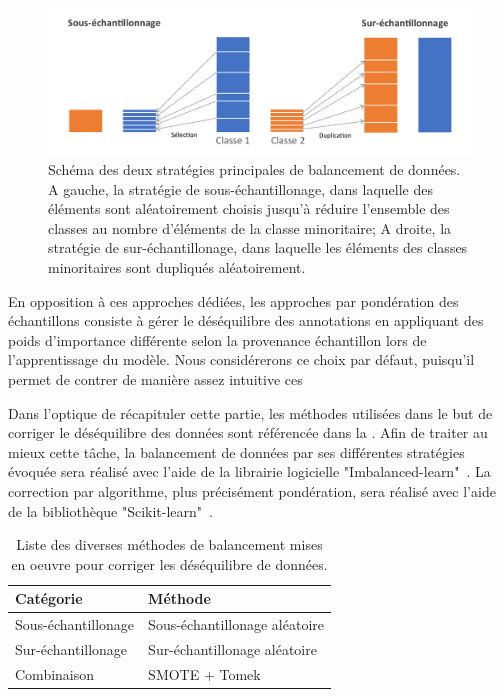\begin{figure}[H]
    \centering
    \includegraphics[width=\linewidth]{contents/chapter_4/resources/scheme_data_balancing.pdf}
    \caption{Schéma des deux stratégies principales de balancement de données. A gauche, la stratégie de sous-échantillonage, dans laquelle des éléments sont aléatoirement choisis jusqu'à réduire l'ensemble des classes au nombre d'éléments de la classe minoritaire; A droite, la stratégie de sur-échantillonage, dans laquelle les éléments des classes minoritaires sont dupliqués aléatoirement. }
    \label{fig:scheme_data_balancing}
\end{figure}\par

En opposition à ces approches dédiées, les approches par pondération des échantillons consiste à gérer le déséquilibre des annotations en appliquant des poids d'importance différente selon la provenance échantillon lors de l'apprentissage du modèle. Nous considérerons ce choix par défaut, puisqu'il permet de contrer de manière assez intuitive ces

Dans l'optique de récapituler cette partie, les méthodes utilisées dans le but de corriger le déséquilibre des données sont référencée dans la . Afin de traiter au mieux cette tâche, la balancement de données par ses différentes stratégies évoquée sera réalisé avec l'aide de la librairie logicielle "Imbalanced-learn"~\cite{Lemaitre2017}. La correction par algorithme, plus précisément pondération, sera réalisé avec l'aide de la bibliothèque "Scikit-learn"~\cite{pedregosa2011}.\par

\begin{table}[H]
    \centering
    \begin{tabular*}{0.6\linewidth}{l@{\extracolsep{\fill}}l}
    \toprule
    \textbf{Catégorie}                  & \textbf{Méthode}                  \\ \hline
    Sous-échantillonage                 & Sous-échantillonage aléatoire     \\ \hline
    Sur-échantillonage                  & Sur-échantillonage aléatoire      \\ \hline
    Combinaison                         & SMOTE + Tomek                     \\
    \end{tabular*}
    \caption{Liste des diverses méthodes de balancement mises en oeuvre pour corriger les déséquilibre de données.}
    \label{tab:summary_balancement_methods}
\end{table}\par

